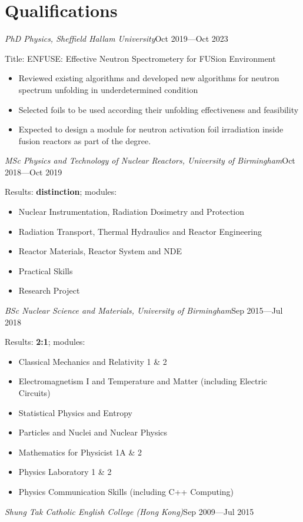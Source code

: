 \documentclass[a4paper, 12pt]{article}
\newcommand{\expentry}[3]{\emph{#1}\hfill{#2}---{#3}}
\begin{document}
\section{Qualifications}
\expentry{PhD Physics, Sheffield Hallam University}{Oct 2019}{Oct 2023}
    
    Title: ENFUSE: Effective Neutron Spectrometery for FUSion Environment
    \begin{itemize}
    \setlength\itemsep{0em}
    \item Reviewed existing algorithms and developed new algorithms for neutron spectrum unfolding in underdetermined condition
    \item Selected foils to be used according their unfolding effectiveness and feasibility
    \item Expected to design a module for neutron activation foil irradiation inside fusion reactors as part of the degree.
    \end{itemize}
\begin{adjustwidth}{-0.3cm}{-0.7cm} %
\expentry{MSc Physics and Technology of Nuclear Reactors, University of Birmingham}{Oct 2018}{Oct 2019}
\end{adjustwidth} %

    Results: \textbf{distinction}; modules:
    \begin{itemize}
    \setlength\itemsep{0em}
    \item Nuclear Instrumentation, Radiation Dosimetry and Protection
    \item Radiation Transport, Thermal Hydraulics and Reactor Engineering
    \item Reactor Materials, Reactor System and NDE
    \item Practical Skills
    \item Research Project
    \end{itemize}
\expentry{BSc Nuclear Science and Materials, University of Birmingham} {Sep 2015}{Jul 2018}

    Results: \textbf{2:1}; modules:
    \begin{itemize}
    \setlength\itemsep{0em}
    \item Classical Mechanics and Relativity 1 \& 2
    \item Electromagnetism I and Temperature and Matter (including Electric Circuits)
    \item Statistical Physics and Entropy
    \item Particles and Nuclei and Nuclear Physics
    \item Mathematics for Physicist 1A \& 2
    \item Physics Laboratory 1 \& 2
    \item Physics Communication Skills (including C++ Computing)
    \end{itemize}
\expentry{Shung Tak Catholic English College (Hong Kong)}{Sep 2009}{Jul 2015}
    
\end{document}
